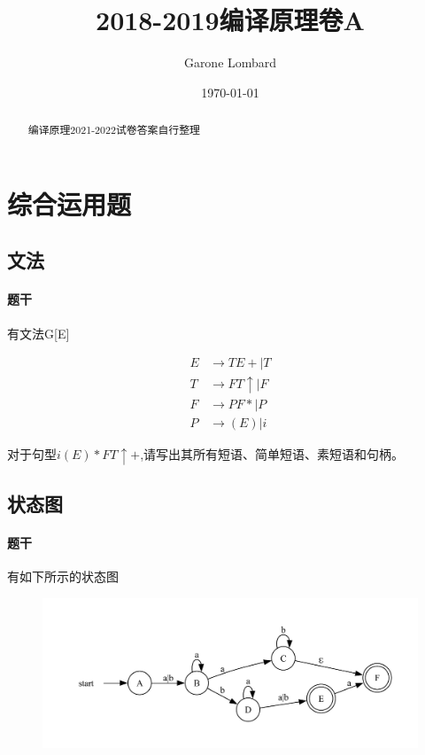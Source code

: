 \documentclass[UTF8]{ctexart} %
\title{2018-2019编译原理卷A}
\author{Garone Lombard}
\date{\today}
\begin{document}
\maketitle %

\newpage

\begin{abstract}
    编译原理2021-2022试卷答案自行整理
\end{abstract}

\newpage

\tableofcontents

\newpage

\section{综合运用题}

\subsection{文法}

\paragraph{题干} 有文法G[E]

\begin{equation}
    \begin{aligned}
        E & \rightarrow TE+|T        \\
        T & \rightarrow FT\uparrow|F \\
        F & \rightarrow PF*|P        \\
        P & \rightarrow (E)|i
    \end{aligned}
\end{equation}

对于句型$i(E)*FT\uparrow +$,请写出其所有短语、简单短语、素短语和句柄。

\subsection{状态图}

\paragraph{题干} 有如下所示的状态图

\begin{figure}[H]
    \centering
    \includegraphics[width=\textwidth]{assets/nfa.pdf}
\end{figure}
\end{document}
